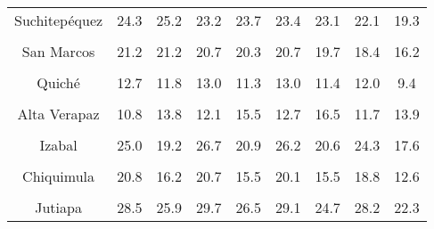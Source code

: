 \begin{tabular}[t]{ccccccccc}
Suchitepéquez & 24.3 & 25.2 & 23.2 & 23.7 & 23.4 & 23.1 & 22.1 & 19.3\\
\cellcolor[HTML]{B6B3FF}{Retalhuleu} & \cellcolor[HTML]{B6B3FF}{30.2} & \cellcolor[HTML]{B6B3FF}{30.4} & \cellcolor[HTML]{B6B3FF}{42.8} & \cellcolor[HTML]{B6B3FF}{30.6} & \cellcolor[HTML]{B6B3FF}{31.5} & \cellcolor[HTML]{B6B3FF}{30.6} & \cellcolor[HTML]{B6B3FF}{31.2} & \cellcolor[HTML]{B6B3FF}{27.4}\\
San Marcos & 21.2 & 21.2 & 20.7 & 20.3 & 20.7 & 19.7 & 18.4 & 16.2\\
\cellcolor[HTML]{B6B3FF}{Huehuetenango} & \cellcolor[HTML]{B6B3FF}{11.5} & \cellcolor[HTML]{B6B3FF}{10.9} & \cellcolor[HTML]{B6B3FF}{11.7} & \cellcolor[HTML]{B6B3FF}{10.9} & \cellcolor[HTML]{B6B3FF}{12.0} & \cellcolor[HTML]{B6B3FF}{11.0} & \cellcolor[HTML]{B6B3FF}{11.4} & \cellcolor[HTML]{B6B3FF}{9.0}\\
Quiché & 12.7 & 11.8 & 13.0 & 11.3 & 13.0 & 11.4 & 12.0 & 9.4\\
\cellcolor[HTML]{B6B3FF}{Baja Verapaz} & \cellcolor[HTML]{B6B3FF}{17.6} & \cellcolor[HTML]{B6B3FF}{16.9} & \cellcolor[HTML]{B6B3FF}{18.4} & \cellcolor[HTML]{B6B3FF}{17.3} & \cellcolor[HTML]{B6B3FF}{18.9} & \cellcolor[HTML]{B6B3FF}{17.3} & \cellcolor[HTML]{B6B3FF}{17.8} & \cellcolor[HTML]{B6B3FF}{13.7}\\
Alta Verapaz & 10.8 & 13.8 & 12.1 & 15.5 & 12.7 & 16.5 & 11.7 & 13.9\\
\cellcolor[HTML]{B6B3FF}{Petén} & \cellcolor[HTML]{B6B3FF}{22.3} & \cellcolor[HTML]{B6B3FF}{18.4} & \cellcolor[HTML]{B6B3FF}{22.9} & \cellcolor[HTML]{B6B3FF}{17.9} & \cellcolor[HTML]{B6B3FF}{22.1} & \cellcolor[HTML]{B6B3FF}{17.0} & \cellcolor[HTML]{B6B3FF}{20.1} & \cellcolor[HTML]{B6B3FF}{13.7}\\
Izabal & 25.0 & 19.2 & 26.7 & 20.9 & 26.2 & 20.6 & 24.3 & 17.6\\
\cellcolor[HTML]{B6B3FF}{Zacapa} & \cellcolor[HTML]{B6B3FF}{27.9} & \cellcolor[HTML]{B6B3FF}{21.8} & \cellcolor[HTML]{B6B3FF}{28.8} & \cellcolor[HTML]{B6B3FF}{22.5} & \cellcolor[HTML]{B6B3FF}{28.5} & \cellcolor[HTML]{B6B3FF}{23.2} & \cellcolor[HTML]{B6B3FF}{27.7} & \cellcolor[HTML]{B6B3FF}{23.0}\\
Chiquimula & 20.8 & 16.2 & 20.7 & 15.5 & 20.1 & 15.5 & 18.8 & 12.6\\
\cellcolor[HTML]{B6B3FF}{Jalapa} & \cellcolor[HTML]{B6B3FF}{19.9} & \cellcolor[HTML]{B6B3FF}{16.9} & \cellcolor[HTML]{B6B3FF}{20.5} & \cellcolor[HTML]{B6B3FF}{17.6} & \cellcolor[HTML]{B6B3FF}{20.8} & \cellcolor[HTML]{B6B3FF}{17.3} & \cellcolor[HTML]{B6B3FF}{18.8} & \cellcolor[HTML]{B6B3FF}{13.1}\\
Jutiapa & 28.5 & 25.9 & 29.7 & 26.5 & 29.1 & 24.7 & 28.2 & 22.3\\
\bottomrule
\end{tabular}
